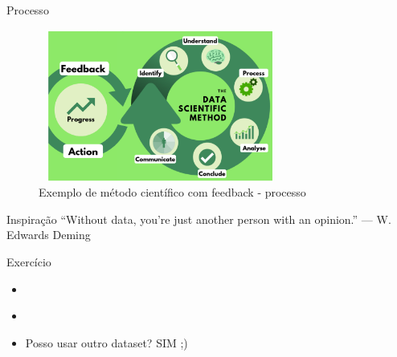\begin{frame}
	\begin{block}{Processo}
		\begin{figure}[!htb]
			\centering	  				
			\includegraphics[height=5cm, width = 8cm]{./pic/metodoAdaptadoFeedback.png}
			\caption{Exemplo de método científico com feedback - processo}
		\end{figure}
	\end{block}
\end{frame}


\begin{frame}
	\begin{block}{Inspiração}
		``Without data, you’re just another person with an opinion.'' — W. Edwards Deming
	\end{block}
\end{frame}


\begin{frame}
	\begin{block}{Exercício}
		\begin{itemize}
			\item \href{https://www.kaggle.com/datasets}{\color{blue}{Kaggle}}
			\item \href{https://archive.ics.uci.edu/ml/index.php}{\color{blue}{UCI}} 
			\item Posso usar outro dataset? SIM ;)
		\end{itemize}
	\end{block}
\end{frame}
